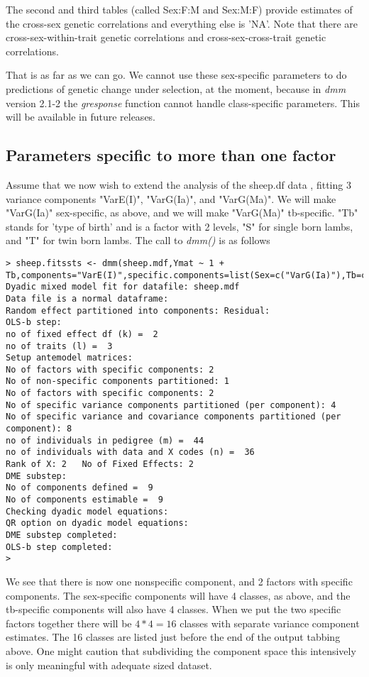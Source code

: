 \documentclass[titlepage]{article}  %
\begin{document}
The second and third tables (called Sex:F:M and Sex:M:F) provide estimates of the cross-sex genetic correlations and everything else is 'NA'. Note that there are cross-sex-within-trait genetic correlations and cross-sex-cross-trait genetic correlations.

That is as far as we can go. We cannot use these sex-specific parameters to do predictions of genetic change under selection, at the moment, because in {\em dmm} version 2.1-2 the {\em gresponse} function cannot handle class-specific parameters. This will be available in future releases.

\subsection{Parameters specific to more than one factor}

Assume that we now wish to extend the analysis of the sheep.df data , fitting 3 variance components "VarE(I)", "VarG(Ia)", and "VarG(Ma)". We will make "VarG(Ia)" sex-specific, as above, and we will make "VarG(Ma)" tb-specific. "Tb" stands for 'type of birth' and is a factor with 2 levels, "S" for single born lambs, and "T" for twin born lambs. The call to {\em dmm()} is as follows

\begin{verbatim}
> sheep.fitssts <- dmm(sheep.mdf,Ymat ~ 1 + Tb,components="VarE(I)",specific.components=list(Sex=c("VarG(Ia)"),Tb=c("VarG(Ma)")))
Dyadic mixed model fit for datafile: sheep.mdf  
Data file is a normal dataframe:
Random effect partitioned into components: Residual:
OLS-b step:
no of fixed effect df (k) =  2 
no of traits (l) =  3 
Setup antemodel matrices:
No of factors with specific components: 2 
No of non-specific components partitioned: 1 
No of factors with specific components: 2 
No of specific variance components partitioned (per component): 4 
No of specific variance and covariance components partitioned (per component): 8 
no of individuals in pedigree (m) =  44 
no of individuals with data and X codes (n) =  36 
Rank of X: 2   No of Fixed Effects: 2 
DME substep:
No of components defined =  9 
No of components estimable =  9 
Checking dyadic model equations:
QR option on dyadic model equations:
DME substep completed:
OLS-b step completed:
> 
\end{verbatim}
We see that there is now one nonspecific component, and 2 factors with specific components. The sex-specific components will have 4 classes, as above, and the tb-specific components will also have 4 classes. When we put the two specific factors together there will be $4 * 4 = 16$ classes with separate variance component estimates. The 16 classes are listed just before the end of the output tabbing above. One might caution that subdividing the component space this intensively is only meaningful with adequate sized dataset.
\end{document}
